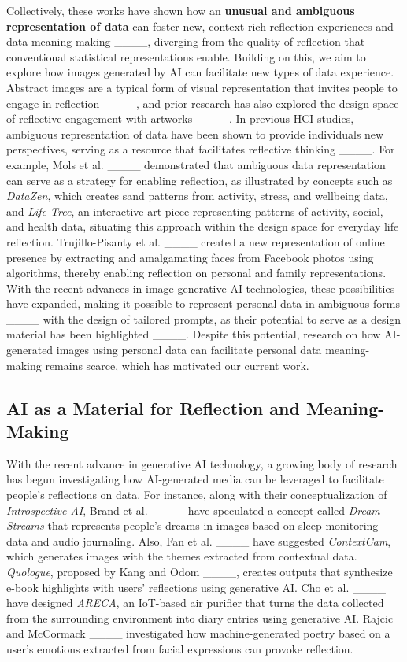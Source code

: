 Collectively, these works have shown how an \textbf{unusual and ambiguous representation of data} can foster new, context-rich reflection experiences and data meaning-making ____, diverging from the quality of reflection that conventional statistical representations enable. Building on this, we aim to explore how images generated by AI can facilitate new types of data experience. Abstract images are a typical form of visual representation that invites people to engage in reflection ____, and prior research has also explored the design space of reflective engagement with artworks ____. In previous HCI studies, ambiguous representation of data have been shown to provide individuals new perspectives, serving as a resource that facilitates reflective thinking ____. For example, Mols et al. ____ demonstrated that ambiguous data representation can serve as a strategy for enabling reflection, as illustrated by concepts such as \textit{DataZen}, which creates sand patterns from activity, stress, and wellbeing data, and \textit{Life Tree}, an interactive art piece representing patterns of activity, social, and health data, situating this approach within the design space for everyday life reflection. Trujillo-Pisanty et al. ____ created a new representation of online presence by extracting and amalgamating faces from Facebook photos using algorithms, thereby enabling reflection on personal and family representations. With the recent advances in image-generative AI technologies, these possibilities have expanded, making it possible to represent personal data in ambiguous forms ____ with the design of tailored prompts, as their potential to serve as a design material has been highlighted ____. Despite this potential, research on how AI-generated images using personal data can facilitate personal data meaning-making remains scarce, which has motivated our current work.

\subsection{AI as a Material for Reflection and Meaning-Making}
With the recent advance in generative AI technology, a growing body of research has begun investigating how AI-generated media can be leveraged to facilitate people’s reflections on data. For instance, along with their conceptualization of \textit{Introspective AI}, Brand et al. ____ have speculated a concept called \textit{Dream Streams} that represents people’s dreams in images based on sleep monitoring data and audio journaling. Also, Fan et al. ____ have suggested \textit{ContextCam}, which generates images with the themes extracted from contextual data. \textit{Quologue}, proposed by Kang and Odom ____, creates outputs that synthesize e-book highlights with users’ reflections using generative AI. Cho et al. ____ have designed \textit{ARECA}, an IoT-based air purifier that turns the data collected from the surrounding environment into diary entries using generative AI. Rajcic and McCormack ____ investigated how machine-generated poetry based on a user’s emotions extracted from facial expressions can provoke reflection.

